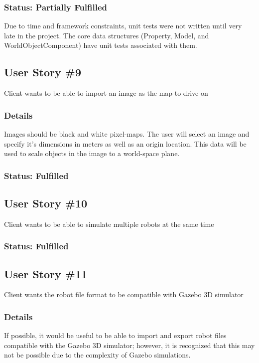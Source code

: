 \subsubsection*{Status: Partially Fulfilled}
Due to time and framework constraints, unit tests were not written until very late in the project. The core data structures (Property, Model, and WorldObjectComponent) have unit tests associated with them.

\subsection{User Story \#9} 
Client wants to be able to import an image as the map to drive on

\subsubsection*{Details}
Images should be black and white pixel-maps. The user will select an image and specify it's dimensions in meters as well as an origin location. This data will be used to scale objects in the image to a world-space plane.

\subsubsection*{Status: Fulfilled}

\subsection{User Story \#10} 
Client wants to be able to simulate multiple robots at the same time

\subsubsection*{Status: Fulfilled}

\subsection{User Story \#11} 
Client wants the robot file format to be compatible with Gazebo 3D simulator

\subsubsection*{Details}
If possible, it would be useful to be able to import and export robot files compatible with the Gazebo 3D simulator; however, it is recognized that this may not be possible due to the complexity of Gazebo simulations.

